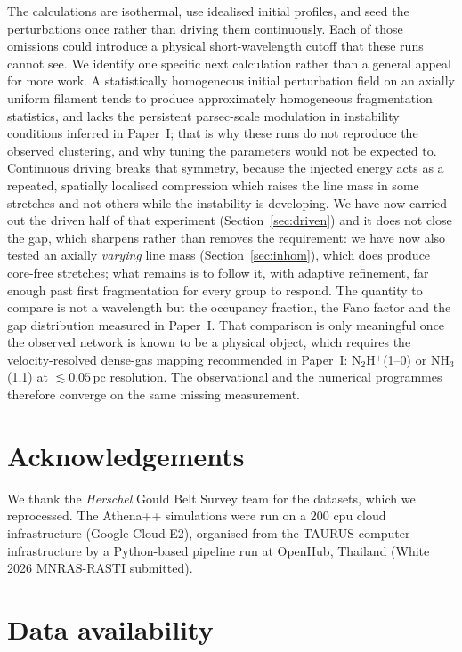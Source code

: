 \documentclass[usenatbib,twoside,twocolumn]{mnras}
\begin{document}
The calculations are isothermal, use idealised initial profiles, and seed the perturbations once rather than driving them continuously. Each of those omissions could introduce a physical short-wavelength cutoff that these runs cannot see. We identify one specific next calculation rather than a general appeal for more work. A statistically homogeneous initial perturbation field on an axially uniform filament tends to produce approximately homogeneous fragmentation statistics, and lacks the persistent parsec-scale modulation in instability conditions inferred in Paper~I; that is why these runs do not reproduce the observed clustering, and why tuning the parameters would not be expected to. Continuous driving breaks that symmetry, because the injected energy acts as a repeated, spatially localised compression which raises the line mass in some stretches and not others while the instability is developing. We have now carried out the driven half of that experiment (Section~\ref{sec:driven}) and it does not close the gap, which sharpens rather than removes the requirement: we have now also tested an axially \emph{varying} line mass (Section~\ref{sec:inhom}), which does produce core-free stretches; what remains is to follow it, with adaptive refinement, far enough past first fragmentation for every group to respond. The quantity to compare is not a wavelength but the occupancy fraction, the Fano factor and the gap distribution measured in Paper~I. That comparison is only meaningful once the observed network is known to be a physical object, which requires the velocity-resolved dense-gas mapping recommended in Paper~I: N$_2$H$^+$(1--0) or NH$_3$(1,1) at $\lesssim0.05$\,pc resolution. The observational and the numerical programmes therefore converge on the same missing measurement.

\section*{Acknowledgements}

We thank the \textit{Herschel} Gould Belt Survey team for the datasets, which we reprocessed. The Athena++ simulations were run on a 200 cpu cloud infrastructure (Google Cloud E2), organised from the TAURUS computer infrastructure by a Python-based pipeline run at OpenHub, Thailand (White 2026 MNRAS-RASTI submitted).

\section*{Data availability}
\end{document}
